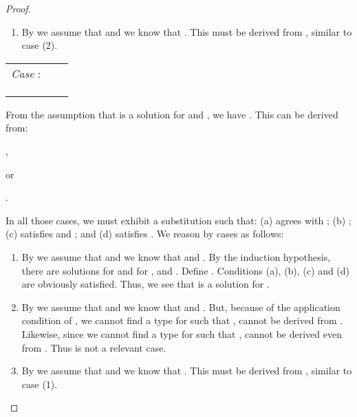 \documentclass{eptcs}
\newcommand{\ih}{induction hypothesis\xspace}
\begin{document}
\begin{proof}
\begin{enumerate}
\item By  we assume that  and we know that
. This must be derived from , similar to case (2). 
\end{enumerate}

\begin{flushleft}
\begin{tabular}{lll}
        \textit{Case} :       & 
                                &                        \\
                                
                                &                   
                                &                                   \\
                                
                                & 
                                &  \\
                                
                                &  & \\
\end{tabular}
\end{flushleft}

From the assumption that  is a solution for  and , we have
. This can be derived from:
\begin{inparaenum}[1)] 
\item ,
\item  or
\item . 
\end{inparaenum}
In all those cases, we must exhibit a substitution  such that: (a)  agrees with ; (b) ; (c) 
satisfies  and ; and (d)  satisfies . We reason by cases as follows:  

\begin{enumerate}
\item By  we assume that  and we know that
 and . By the \ih, there are
solutions  for 
and  for , and
. Define . Conditions (a), (b), (c) and (d) are obviously satisfied. Thus, we
see that  is a solution for .

\item By  we assume that  and we know that
 and . But, because of the
application condition of , we cannot find a type  for
 such that ,  cannot be derived from . Likewise, since we cannot find a type
 for  such that ,  cannot be derived even from . Thus  is not a relevant case.

\item By  we assume that  and we know that
. This must be derived from , similar to case (1). 
\end{enumerate}


\end{proof}
\end{document}
